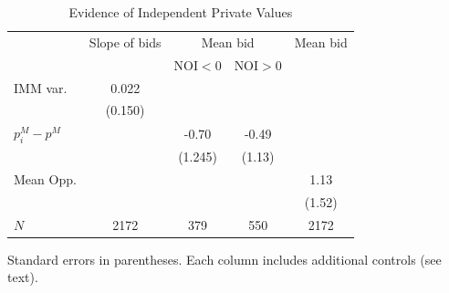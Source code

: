 \begin{table}[htbp]
\centering
\caption{Evidence of Independent Private Values}
\label{tab:ipv}
\begin{tabular}{lc|cc|c}
\hline\hline
 & Slope of bids & \multicolumn{2}{c|}{Mean bid} & Mean bid \\
 &  & NOI$<$0 & NOI$>$0 &  \\
\hline
IMM var. & 0.022 &  &  &  \\
 & (0.150) &  &  &  \\
$p_i^M - p^M$ &  & -0.70 & -0.49 &  \\
 &  & (1.245) & (1.13) &  \\
Mean Opp. &  &  &  & 1.13 \\
 &  &  &  & (1.52) \\
\hline
$N$ & 2172 & 379 & 550 & 2172 \\
\hline\hline
\end{tabular}
\begin{tablenotes}\small\item Standard errors in parentheses. Each column includes additional controls (see text).\end{tablenotes}
\end{table}
